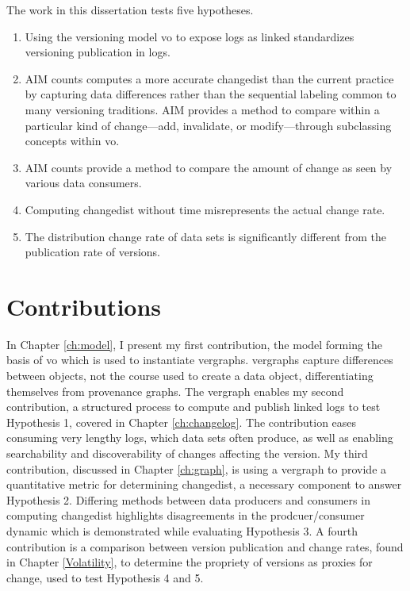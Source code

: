 The work in this dissertation tests five hypotheses.
\begin{enumerate}
	\item Using the versioning model \gls{vo} to expose \glspl{log} as \gls{linked} standardizes versioning publication in \glspl{log}.
	\item \gls{AIM} counts computes a more accurate \gls{changedist} than the current practice by capturing data differences rather than the sequential labeling common to many versioning traditions.  \gls{AIM} provides a method to compare within a particular kind of change---\gls{add}, \gls{invalidate}, or \gls{modify}---through subclassing concepts within \gls{vo}.
	\item \gls{AIM} counts provide a method to compare the amount of change as seen by various data consumers.
	\item Computing \gls{changedist} without time misrepresents the actual change rate.
	\item The distribution change rate of data sets is significantly different from the publication rate of versions.
\end{enumerate}

\section{Contributions}


In Chapter \ref{ch:model}, I present my first contribution, the model forming the basis of \gls{vo} which is used to instantiate \glspl{vergraph}.
\Glspl{vergraph} capture differences between objects, not the course used to create a data object, differentiating themselves from provenance graphs.
The \gls{vergraph} enables my second contribution, a structured process to compute and publish \gls{linked} \glspl{log} to test Hypothesis 1, covered in Chapter \ref{ch:changelog}.
The contribution eases consuming very lengthy logs, which data sets often produce, as well as enabling searchability and discoverability of \glspl{change} affecting the \gls{version}.
My third contribution, discussed in Chapter \ref{ch:graph}, is using a \gls{vergraph} to provide a quantitative metric for determining \gls{changedist}, a necessary component to answer Hypothesis 2.
Differing methods between data producers and consumers in computing \gls{changedist} highlights disagreements in the prodcuer/consumer dynamic which is demonstrated while evaluating Hypothesis 3.
A fourth contribution is a comparison between version publication and change rates, found in Chapter \ref{Volatility}, to determine the propriety of versions as proxies for change, used to test Hypothesis 4 and 5.

